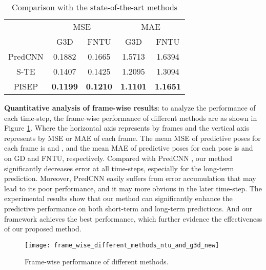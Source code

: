 \documentclass[journal]{IEEEtran}
\begin{document}
\begin{table}[!t]
\renewcommand{\arraystretch}{1.3}
\caption{Comparison with the state-of-the-art methods}
\label{table1}
\centering
\begin{tabular}{ccccc}
\hline
\multirow{2}{*}{}& \multicolumn{2}{c}{MSE} & \multicolumn{2}{c}{MAE} \\
\cline{2-5}& G3D &FNTU & G3D &FNTU \\
\hline
PredCNN\cite{predcnn}&0.1882&0.1665&1.5713&1.6394 \\
S-TE\cite{ButepageDRL}&0.1407&0.1425&1.2095&1.3094 \\
PISEP&{\bf 0.1199}&{\bf 0.1210}&{\bf 1.1101}&{\bf 1.1651} \\
\hline
\end{tabular}
\end{table}

{\bf Quantitative analysis of frame-wise results}: to analyze the performance of each time-step, the frame-wise performance of different methods are as shown in Figure \ref{fig6}. Where the horizontal axis represents by frames and the vertical axis represents by MSE or MAE of each frame. The mean MSE of predictive poses for each frame is  and , and the mean MAE of predictive poses for each pose is  and  on GD and FNTU, respectively. Compared with PredCNN \cite{predcnn}, our method significantly decreases error at all time-steps, especially for the long-term prediction. Moreover, PredCNN easily suffers from error accumulation that may lead to its poor performance, and it may more obvious in the later time-step. The experimental results show that our method can significantly enhance the predictive performance on both short-term and long-term predictions. And our framework achieves the best performance, which further evidence the effectiveness of our proposed method.

\begin{figure}[!t]
\centering
\texttt{[image: frame\_wise\_different\_methods\_ntu\_and\_g3d\_new]}
\caption{Frame-wise performance of different methods.}
\label{fig6}
\end{figure}
\end{document}
